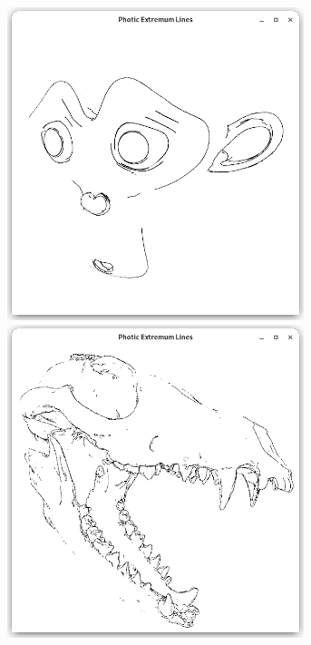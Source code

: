 \documentclass[9pt,fleqn,twoside,twocolumn]{stdglobal}
\begin{document}
\begin{figure}
\begin{subfigure}[t]{0.19\textwidth}
        \includegraphics[width=0.95\textwidth,trim={15px 15 15 50},clip]{images/results/suzanne-pel.png}
        \includegraphics[width=0.95\textwidth,trim={15px 15 15 50},clip]{images/results/skull-pel.png}

\end{subfigure}
\end{figure}
\end{document}

